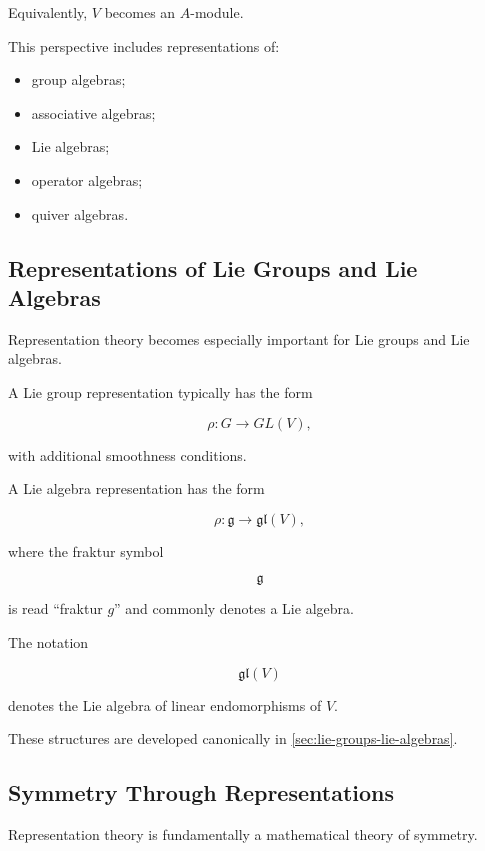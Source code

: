 Equivalently, \(V\) becomes an \(A\)-module.

This perspective includes representations of:

\begin{itemize}
    \item group algebras;
    \item associative algebras;
    \item Lie algebras;
    \item operator algebras;
    \item quiver algebras.
\end{itemize}

\subsection{Representations of Lie Groups and Lie Algebras}
\label{subsec:representation-lie-preview}

Representation theory becomes especially important for Lie groups and Lie
algebras.

A Lie group representation typically has the form

\[ \rho:G\to GL(V), \]

with additional smoothness conditions.

A Lie algebra representation has the form

\[ \rho:\mathfrak g\to\mathfrak{gl}(V), \]

where the fraktur symbol

\[ \mathfrak g \]

is read ``fraktur \(g\)'' and commonly denotes a Lie algebra.

The notation

\[ \mathfrak{gl}(V) \]

denotes the Lie algebra of linear endomorphisms of \(V\).

These structures are developed canonically in
\cref{sec:lie-groups-lie-algebras}.

\subsection{Symmetry Through Representations}
\label{subsec:symmetry-through-representations}

Representation theory is fundamentally a mathematical theory of symmetry.

